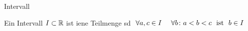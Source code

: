 \documentclass[class=article, crop=false]{standalone}
\begin{document}
\begin{zettel}{Intervall}
\begin{flashcard}[]{}
	\begin{definition}
		Ein Intervall $I \subset \mathbb{R} $ ist iene Teilmenge sd $\forall  a , c \in  I \quad \forall  b \colon a <  b <  c \tx{ ist } b \in  I$

	\end{definition}

\end{flashcard}
\end{zettel}
\end{document}
